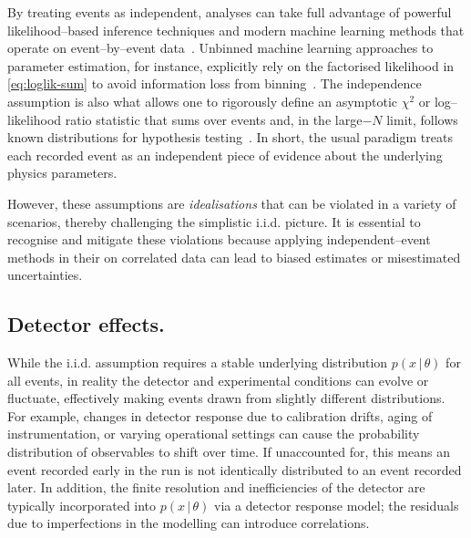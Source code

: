     By treating events as independent, analyses can take full advantage of powerful likelihood--based inference techniques and modern machine learning methods that operate on event--by--event data~\cite{GomezAmbrosio:2022mpm, mishra-sharma_smsharmaawesome-neural-sbi_2025, noauthor_simulation-based-inferencesimulation-based-inferencegithubio_2025}.
    Unbinned machine learning approaches to parameter estimation, for instance, explicitly rely on the factorised likelihood in \cref{eq:loglik-sum} to avoid information loss from binning~\cite{GomezAmbrosio:2022mpm, Arratia:2021otl, du_unifying_2024}.
    The independence assumption is also what allows one to rigorously define an asymptotic $\chi^2$ or log--likelihood ratio statistic that sums over events and, in the large$-N$ limit, follows known distributions for hypothesis testing~\cite{Canonero:2023sua, Letizia:2022xbe, du_unifying_2024}.
    In short, the usual paradigm treats each recorded event as an independent piece of evidence about the underlying physics parameters.

    However, these assumptions are \emph{idealisations} that can be violated in a variety of scenarios, thereby challenging the simplistic i.i.d. picture.
    It is essential to recognise and mitigate these violations because applying independent--event methods in their on correlated data can lead to biased estimates or misestimated uncertainties.
    
    \subsection{Detector effects.}
    
        While the i.i.d. assumption requires a stable underlying distribution $p(x\,|\,\theta)$ for all events, in reality the detector and experimental conditions can evolve or fluctuate, effectively making events drawn from slightly different distributions.
        For example, changes in detector response due to calibration drifts, aging of instrumentation, or varying operational settings can cause the probability distribution of observables to shift over time.
        If unaccounted for, this means an event recorded early in the run is not identically distributed to an event recorded later.
        In addition, the finite resolution and inefficiencies of the detector are typically incorporated into $p(x\,|\,\theta)$ via a detector response model;
        the residuals due to imperfections in the modelling can introduce correlations.
        

